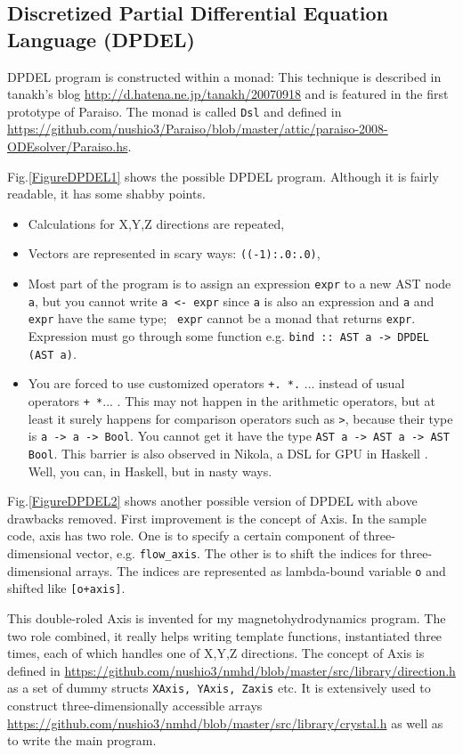 \documentclass[twocolumn]{article}
\begin{document}
\subsection{Discretized Partial Differential Equation Language (DPDEL)}

DPDEL program is constructed within a monad: This technique is
described in tanakh's blog \url{http://d.hatena.ne.jp/tanakh/20070918}
and is featured in the first prototype of Paraiso. The monad is called
{\tt Dsl} and defined in
\url{https://github.com/nushio3/Paraiso/blob/master/attic/paraiso-2008-ODEsolver/Paraiso.hs}.


Fig.\ref{FigureDPDEL1} shows the possible DPDEL program. Although it is fairly
readable, it has some shabby points.
\begin{itemize}
  \item Calculations for X,Y,Z directions are repeated,
  \item Vectors are represented in scary ways: {\tt ((-1):.0:.0)},
  \item Most part of the program is to assign an expression {\tt expr} to a
    new AST node {\tt a}, but you cannot write {\tt a <- expr} since {\tt a}
    is also an expression and {\tt a} and {\tt expr} have the same type; {\tt
      expr} cannot be a monad that returns {\tt expr}.  Expression must go
    through some function e.g. {\tt bind :: AST a -> DPDEL (AST a)}.
  \item You are forced to use customized operators {\tt+. *.} ... instead of
    usual operators {\tt+ *}... . This may not happen in the arithmetic
    operators, but at least it surely happens for comparison operators such as
    {\tt>}, because their type is {\tt a -> a -> Bool}. You cannot get it have
    the type {\tt AST a -> AST a -> AST Bool}. This barrier is also observed
    in Nikola, a DSL for GPU in Haskell
    \cite{Mainland:2010:NEC:1863523.1863533}. Well, you can, in Haskell, but
    in nasty ways.
\end{itemize}

Fig.\ref{FigureDPDEL2} shows another possible version of DPDEL with
above drawbacks removed.  First improvement is the concept of Axis. In
the sample code, axis has two role.  One is to specify a certain
component of three-dimensional vector, e.g. {\tt flow\_axis}. The
other is to shift the indices for three-dimensional arrays. The
indices are represented as lambda-bound variable {\tt o} and shifted
like {\tt [o+axis]}.

This double-roled Axis is invented for my magnetohydrodynamics
program. The two role combined, it really helps writing template
functions, instantiated three times, each of which handles one of
X,Y,Z directions. The concept of Axis is defined in
\url{https://github.com/nushio3/nmhd/blob/master/src/library/direction.h}
as a set of dummy structs {\tt XAxis, YAxis, Zaxis} etc. It is
extensively used to construct three-dimensionally accessible arrays
\url{https://github.com/nushio3/nmhd/blob/master/src/library/crystal.h}
as well as to write the main program.
\end{document}
